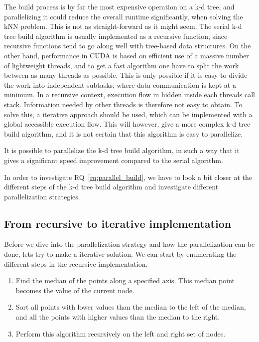 The build process is by far the most expensive operation on a k-d tree, and parallelizing it could reduce the overall runtime significantly, when solving the kNN problem. This is not as straight-forward as it might seem. The serial k-d tree build algorithm is usually implemented as a recursive function, since recursive functions tend to go along well with tree-based data structures. On the other hand, performance in CUDA is based on efficient use of a massive number of lightweight threads, and to get a fast algorithm one have to split the work between as many threads as possible. This is only possible if it is easy to divide the work into independent subtasks, where data communication is kept at a minimum. In a recursive context, execution flow in hidden inside each threads call stack. Information needed by other threads is therefore not easy to obtain. To solve this, a iterative approach should be used, which can be implemented with a global accessible execution flow. This will however, give a more complex k-d tree build algorithm, and it is not certain that this algorithm is easy to parallelize. 

\begin{myrq}
\label{rq:parallel_build}
    It is possible to parallelize the k-d tree build algorithm, in such a way that it gives a significant speed improvement compared to the serial algorithm.
\end{myrq}

In order to investigate RQ~\ref{rq:parallel_build}, we have to look a bit closer at the different steps of the k-d tree build algorithm and investigate different parallelization strategies.

\subsection{From recursive to iterative implementation} %
\label{ssub:from_recursive_to_iterative_implementation}

Before we dive into the parallelization strategy and how the parallelization can be done, lets try to make a iterative solution. We can start by enumerating the different steps in the recursive implementation.

\begin{enumerate}
    \item Find the median of the points along a specified axis. This median point becomes the value of the current node.
    \item Sort all points with lower values than the median to the left of the median, and all the points with higher values than the median to the right.
    \item Perform this algorithm recursively on the left and right set of nodes.
\end{enumerate}

